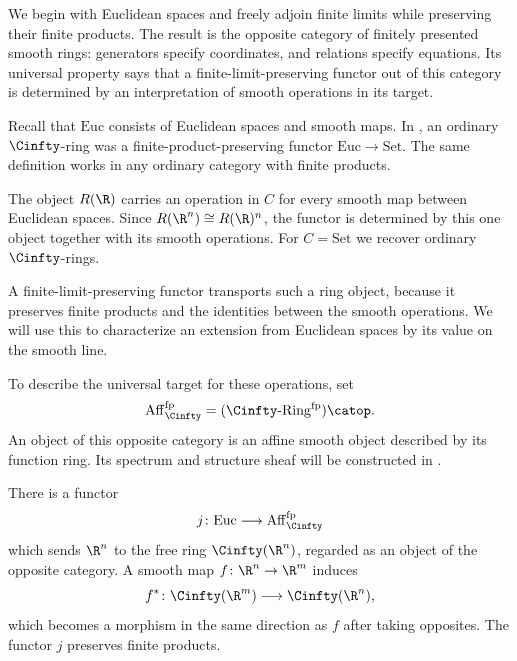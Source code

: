 We begin with Euclidean spaces and freely adjoin finite limits while
preserving their finite products. The
result is the opposite category of finitely presented smooth rings:
generators specify coordinates, and relations specify equations.
Its universal property says that a finite-limit-preserving functor out
of this category is determined by an interpretation of smooth operations
in its target.

Recall that $\mathrm{Euc}$ consists of Euclidean spaces and smooth
maps. In , an ordinary
$\Cinfty$-ring was a finite-product-preserving functor
$\mathrm{Euc}\to\mathrm{Set}$. The same definition works in any ordinary
category with finite products.


The object $R(\R)$ carries an operation in $C$ for every smooth map between
Euclidean spaces. Since $R(\R^n)\cong R(\R)^n$, the functor is determined by
this one object together with its smooth operations. For $C=\mathrm{Set}$ we
recover ordinary $\Cinfty$-rings.

A finite-limit-preserving functor transports such a ring object,
because it preserves finite products and the identities between the
smooth operations. We will use this to characterize an extension
from Euclidean spaces by its value on the smooth line.

To describe the universal target for these operations, set
\[
  \operatorname{Aff}_{\Cinfty}^{\mathrm{fp}}
  =
  (\Cinfty\text{-}\mathrm{Ring}^{\mathrm{fp}})\catop.
\]
An object of this opposite category is an affine smooth object described
by its function ring. Its spectrum and structure sheaf will be constructed
in .

There is a functor
\[
  j\colon\mathrm{Euc}
  \longrightarrow
  \operatorname{Aff}_{\Cinfty}^{\mathrm{fp}}
\]
which sends $\R^n$ to the free ring $\Cinfty(\R^n)$, regarded as an object of
the opposite category. A smooth map $f\colon\R^n\to\R^m$ induces
\[
  f^*\colon\Cinfty(\R^m)\longrightarrow\Cinfty(\R^n),
\]
which becomes a morphism in the same direction as $f$ after taking opposites.
The functor $j$ preserves finite products.

